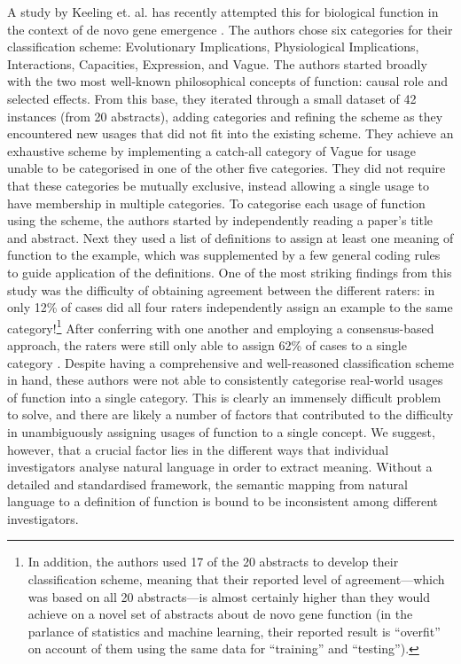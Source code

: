 \documentclass{article}
\begin{document}
A study by Keeling et. al. has recently attempted this for biological function in the context of de novo gene emergence \cite{keeling2019}.
The authors chose six categories for their classification scheme: Evolutionary Implications, Physiological Implications, Interactions, Capacities, Expression, and Vague.
The authors started broadly with the two most well-known philosophical concepts of function: causal role and selected effects.
From this base, they iterated through a small dataset of 42 instances (from 20 abstracts), adding categories and refining the scheme as they encountered new usages that did not fit into the existing scheme.
They achieve an exhaustive scheme by implementing a catch-all category of Vague for usage unable to be categorised in one of the other five categories.
They did not require that these categories be mutually exclusive, instead allowing a single usage to have membership in multiple categories.
To categorise each usage of function using the scheme, the authors started by independently reading a paper's title and abstract.
Next they used a list of definitions to assign at least one meaning of function to the example, which was supplemented by a few general coding rules to guide application of the definitions.
One of the most striking findings from this study was the difficulty of obtaining agreement between the different raters: in only 12\% of cases did all four raters independently assign an example to the same category!\footnote{In addition, the authors used 17 of the 20 abstracts to develop their classification scheme, meaning that their reported level of agreement---which was based on all 20 abstracts---is almost certainly higher than they would achieve on a novel set of abstracts about de novo gene function (in the parlance of statistics and machine learning, their reported result is ``overfit'' on account of them using the same data for ``training'' and ``testing'').}
After conferring with one another and employing a consensus-based approach, the raters were still only able to assign 62\% of cases to a single category \cite{keeling2019}.
Despite having a comprehensive and well-reasoned classification scheme in hand, these authors were not able to consistently categorise real-world usages of function into a single category.
This is clearly an immensely difficult problem to solve, and there are likely a number of factors that contributed to the difficulty in unambiguously assigning usages of function to a single concept.
We suggest, however, that a crucial factor lies in the different ways that individual investigators analyse natural language in order to extract meaning.
Without a detailed and standardised framework, the semantic mapping from natural language to a definition of function is bound to be inconsistent among different investigators.
\end{document}
